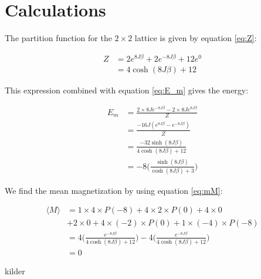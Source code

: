 \documentclass{article}
\begin{document}
\clearpage

\appendix \section{Calculations} %

The partition function for the $2\times2$ lattice is given by equation \ref{eq:Z}:

\begin{equation}
\begin{split}
Z&=2e^{8J\beta}+2e^{-8J\beta}+12e^0\\
&=4\cosh{(8J\beta)}+12
\end{split}
\label{eq:calc_Z}
\end{equation}

This expression combined with equation \ref{eq:E_m} gives the energy:

\begin{equation}
\begin{split}
E_m &= \frac{2\times8Je^{-8J\beta}-2\times8Je^{8J\beta}}{Z}\\
&=\frac{-16J(e^{8J\beta}-e^{-8J\beta})}{Z}\\
&=\frac{-32\sinh{(8J\beta)}}{4\cosh{(8J\beta)}+12}\\
&=-8\bigg(\frac{\sinh{(8J\beta)}}{\cosh{(8J\beta)}+3}\bigg)
\label{eq:calc_E}
\end{split}
\end{equation}

We find the mean magnetization by using equation \ref{eq:mM}:

\begin{equation} \label{eq:calc_M}
\begin{split}
\langle M \rangle& = 1\times 4 \times P(-8) + 4 \times 2 \times P(0) + 4 \times 0 \\
& + 2\times0+4 \times (-2) \times P(0) +  1\times(-4) \times P(-8)\\
&=4\bigg(\frac{e^{-8J\beta }}{4\cosh{(8J\beta)}+12}\bigg)-4\bigg(\frac{e^{-8J\beta }}{4\cosh{(8J\beta)}+12}\bigg) \\
&=0
\end{split}
\end{equation}

\begin{thebibliography}{9}
	kilder
\end{thebibliography}
\end{document}
